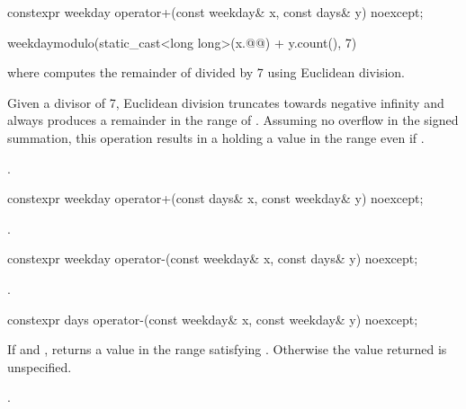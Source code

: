 %
\begin{itemdecl}
constexpr weekday operator+(const weekday& x, const days& y) noexcept;
\end{itemdecl}

\begin{itemdescr}
\pnum
\returns
\begin{codeblock}
weekday{modulo(static_cast<long long>(x.@@) + y.count(), 7)}
\end{codeblock}
where  computes the remainder of  divided by 7 using Euclidean division.
\begin{note}
Given a divisor of 7, Euclidean division truncates towards negative infinity and
always produces a remainder in the range of .
Assuming no overflow in the signed summation,
this operation results in a  holding a value in the range  even if .
\end{note}
\begin{example}
.
\end{example}
\end{itemdescr}

%
\begin{itemdecl}
constexpr weekday operator+(const days& x, const weekday& y) noexcept;
\end{itemdecl}

\begin{itemdescr}
\pnum
\returns
{}.
\end{itemdescr}

%
\begin{itemdecl}
constexpr weekday operator-(const weekday& x, const days& y) noexcept;
\end{itemdecl}

\begin{itemdescr}
\pnum
\returns
{}.
\end{itemdescr}

%
\begin{itemdecl}
constexpr days operator-(const weekday& x, const weekday& y) noexcept;
\end{itemdecl}

\begin{itemdescr}
\pnum
\returns
If 
and ,
returns a value 
in the range 
satisfying .
Otherwise the value returned is unspecified.
\begin{example}
.
\end{example}
\end{itemdescr}

